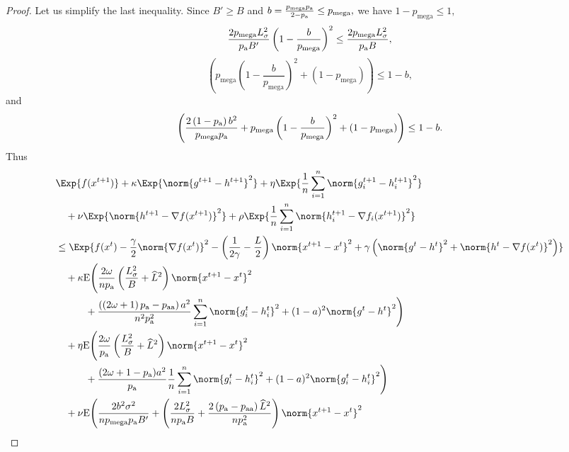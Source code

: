 \documentclass{article}
\newcommand*{\probavailable}{\ensuremath{p_{\textnormal{a}}}}
\newcommand*{\probpairaa}{\ensuremath{p_{\textnormal{aa}}}}
\newcommand*{\probmega}{\ensuremath{p_{\text{mega}}}}
\begin{document}
\begin{proof}
  Let us simplify the last inequality. Since $B' \geq B$ and $b = \frac{\probmega \probavailable}{2 - \probavailable} \leq \probmega,$ we have $1 - \probmega \leq 1,$ $$\frac{2 \probmega L_{\sigma}^2}{\probavailable B'}\left(1 - \frac{b}{\probmega}\right)^2 \leq \frac{2 \probmega L_{\sigma}^2}{\probavailable B},$$ $$\left(\probmega \left(1 - \frac{b}{\probmega}\right)^2 + (1 - \probmega)\right) \leq 1 - b,$$ and $$\left(\frac{2\left(1 - \probavailable\right)b^2}{\probmega \probavailable} + \probmega \left(1 - \frac{b}{\probmega}\right)^2 + (1 - \probmega)\right) \leq 1 - b.$$
  Thus
  \begin{align*}
    &\Exp{f(x^{t + 1})} + \kappa \Exp{\norm{g^{t+1} - h^{t+1}}^2} + \eta \Exp{\frac{1}{n}\sum_{i=1}^n\norm{g^{t+1}_i - h^{t+1}_i}^2}\\
    &\quad  + \nu \Exp{\norm{h^{t+1} - \nabla f(x^{t+1})}^2} + \rho \Exp{\frac{1}{n}\sum_{i=1}^n\norm{h^{t+1}_i - \nabla f_i(x^{t+1})}^2}\\
    &\leq \Exp{f(x^t) - \frac{\gamma}{2}\norm{\nabla f(x^t)}^2 - \left(\frac{1}{2\gamma} - \frac{L}{2}\right)
    \norm{x^{t+1} - x^t}^2 + \gamma\left(\norm{g^{t} - h^t}^2 + \norm{h^t - \nabla f(x^t)}^2\right)}\nonumber\\
    &\quad  + \kappa {\rm E}\Bigg(\frac{2 \omega}{n \probavailable}\left(\frac{L_{\sigma}^2}{B} + \widehat{L}^2\right) \norm{x^{t+1} - x^{t}}^2 \\
    &\qquad\quad + \frac{\left(\left(2 \omega + 1\right)\probavailable - \probpairaa\right)a^2}{n^2 \probavailable^2}\sum_{i=1}^n\norm{g^{t}_i - h^{t}_i}^2 + (1 - a)^2\norm{g^{t} - h^{t}}^2\Bigg) \\
      &\quad  + \eta {\rm E}\Bigg(\frac{2 \omega}{\probavailable} \left(\frac{L_{\sigma}^2}{B} + \widehat{L}^2\right) \norm{x^{t+1} - x^{t}}^2 \\
      &\qquad\quad+ \frac{(2\omega + 1 - \probavailable) a^2}{\probavailable}\frac{1}{n}\sum_{i=1}^n\norm{g^{t}_{i} - h^{t}_{i}}^2 + (1 - a)^2 \norm{g^{t}_{i} - h^{t}_{i}}^2\Bigg) \\
      &\quad  + \nu {\rm E}\Bigg(\frac{2 b^2 \sigma^2}{n \probmega \probavailable B'} + \left(\frac{2 L_{\sigma}^2}{n \probavailable B} + \frac{2\left(\probavailable - \probpairaa\right) \widehat{L}^2}{n \probavailable^2}\right)\norm{x^{t+1} - x^{t}}^2\\

\end{align*}
\end{proof}
\end{document}
